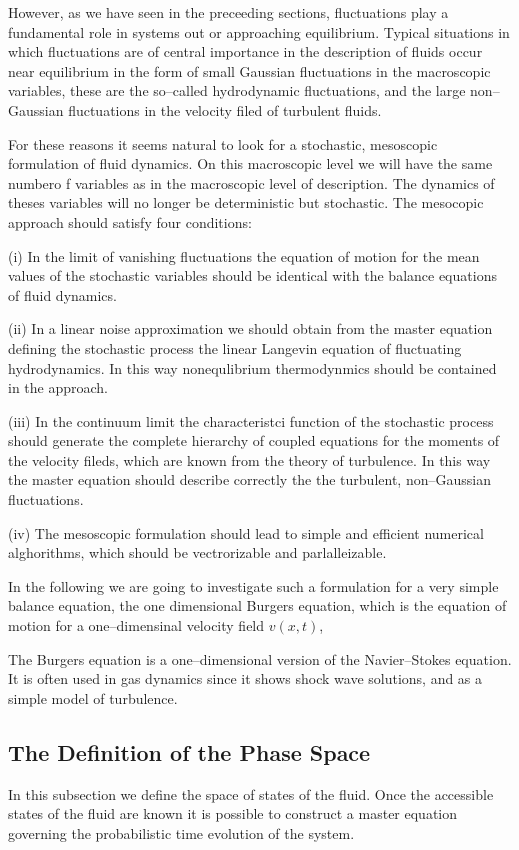 However, as we have seen in the preceeding sections, fluctuations play a
fundamental role in systems out or approaching equilibrium. Typical situations
in which fluctuations are of central importance in the description of fluids
occur near equilibrium in the form of small Gaussian fluctuations in the
macroscopic variables, these are the so--called hydrodynamic fluctuations,
and the large non--Gaussian fluctuations in the velocity filed of turbulent 
fluids.

For these reasons it seems natural to look for a  stochastic, mesoscopic
formulation of fluid dynamics. On this macroscopic level we will have the same
numbero f variables as in the macroscopic level of description. The dynamics
of theses variables will no longer be deterministic but stochastic. The
mesocopic approach should satisfy four conditions:

(i) In the limit of vanishing fluctuations the equation of motion for the 
mean values of the stochastic variables
should be identical with the balance equations of fluid dynamics.

(ii) In a linear noise approximation we should obtain from the master equation
defining the stochastic process the linear Langevin equation of fluctuating
hydrodynamics. In this way nonequlibrium thermodynmics should be contained in
the approach. 

(iii) In the continuum limit the characteristci function of the stochastic
process should generate the complete hierarchy of coupled equations for the
moments of the velocity fileds, which are known from the theory of
turbulence. In this way the master equation should describe correctly the the
turbulent, non--Gaussian fluctuations. 

(iv) The mesoscopic formulation should lead to simple and efficient numerical
alghorithms, which should be vectrorizable and parlalleizable.

In the  following we are going to investigate such a formulation for a very
simple balance equation, the one dimensional Burgers equation, which is the
equation of motion for a one--dimensinal velocity field $v(x,t)$,

The Burgers equation is a one--dimensional version of the Navier--Stokes
equation. It is often used in gas dynamics since it shows shock wave
solutions, and as a simple model of turbulence.

\subsection{The Definition of the Phase Space}
In this subsection we define the space of
states of the fluid. Once the accessible states of the fluid
are known it
is possible to construct a master equation governing the
probabilistic
time evolution of the system. 

